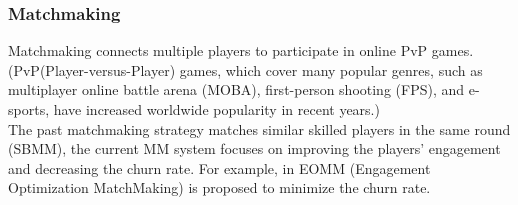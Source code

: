 \documentclass[12pt]{report}
\begin{document}
\subsubsection{Matchmaking}

Matchmaking connects multiple players to participate in online PvP games. (PvP(Player-versus-Player) games,
which cover many popular genres, such as multiplayer online battle arena (MOBA), first-person shooting (FPS),
and e-sports, have increased worldwide popularity in recent years.)\\

The past matchmaking strategy matches similar skilled players in the same round (SBMM), the current MM system focuses on improving
the players' engagement and decreasing the churn rate. For example, in \cite{Chen2017} EOMM (Engagement Optimization MatchMaking) is
proposed to minimize the churn rate.\\
\end{document}
